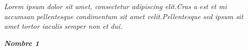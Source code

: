 
\begin{center}

\Large{}

\end{center}

\vspace{10cm}

\begin{flushright}

\parbox[t]{3.3in}{

\textit{
Lorem ipsum dolor sit amet, consectetur adipiscing elit.Cras a est et mi accumsan pellentesque condimentum sit amet velit.Pellentesque sed ipsum sit amet tortor iaculis semper non et dui.
}

}

\vspace{2cm}

\textit{\textbf{Nombre 1}}

\end{flushright}

\pagestyle{empty}

